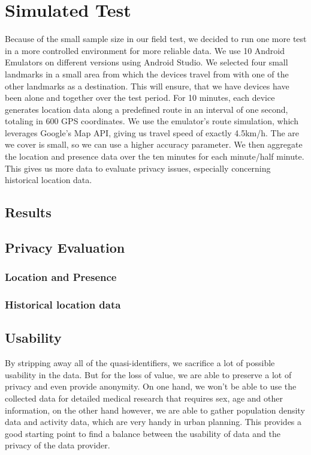 \section{Simulated Test}
Because of the small sample size in our field test, we decided to run one more test in a more controlled environment for more reliable data. We use 10 Android Emulators on different versions using Android Studio. We selected four small landmarks in a small area from which the devices travel from with one of the other landmarks as a destination. This will ensure, that we have devices have been alone and together over the test period. For 10 minutes, each device generates location data along a predefined route in an interval of one second, totaling in 600 GPS coordinates. We use the emulator's route simulation, which leverages Google's Map API, giving us travel speed of exactly 4.5km/h. The are we cover is small, so we can use a higher accuracy parameter. We then aggregate the location and presence data over the ten minutes for each minute/half minute. This gives us more data to evaluate privacy issues, especially concerning historical location data.

\subsection{Results}
\subsection{Privacy Evaluation}
\subsubsection{Location and Presence}
\subsubsection{Historical location data}
\subsection{Usability}
By stripping away all of the quasi-identifiers, we sacrifice a lot of possible usability in the data. But for the loss of value, we are able to preserve a lot of privacy and even provide anonymity. On one hand, we won't be able to use the collected data for detailed medical research that requires sex, age and other information, on the other hand however, we are able to gather population density data and activity data, which are very handy in urban planning. This provides a good starting point to find a balance between the usability of data and the privacy of the data provider.

